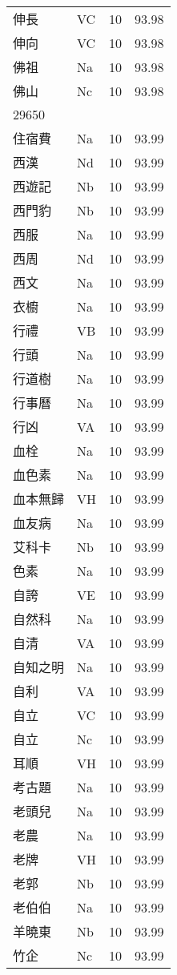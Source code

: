 \documentclass[twocolumn]{book}
\begin{document}
\begin{supertabular}{llrr}
伸長 & VC & 10 &  93.98\\
伸向 & VC & 10 &  93.98\\
佛祖 & Na & 10 &  93.98\\
佛山 & Nc & 10 &  93.98\\
29650\\
住宿費 & Na & 10 &  93.99\\
西漢 & Nd & 10 &  93.99\\
西遊記 & Nb & 10 &  93.99\\
西門豹 & Nb & 10 &  93.99\\
西服 & Na & 10 &  93.99\\
西周 & Nd & 10 &  93.99\\
西文 & Na & 10 &  93.99\\
衣櫥 & Na & 10 &  93.99\\
行禮 & VB & 10 &  93.99\\
行頭 & Na & 10 &  93.99\\
行道樹 & Na & 10 &  93.99\\
行事曆 & Na & 10 &  93.99\\
行凶 & VA & 10 &  93.99\\
血栓 & Na & 10 &  93.99\\
血色素 & Na & 10 &  93.99\\
血本無歸 & VH & 10 &  93.99\\
血友病 & Na & 10 &  93.99\\
艾科卡 & Nb & 10 &  93.99\\
色素 & Na & 10 &  93.99\\
自誇 & VE & 10 &  93.99\\
自然科 & Na & 10 &  93.99\\
自清 & VA & 10 &  93.99\\
自知之明 & Na & 10 &  93.99\\
自利 & VA & 10 &  93.99\\
自立 & VC & 10 &  93.99\\
自立 & Nc & 10 &  93.99\\
耳順 & VH & 10 &  93.99\\
考古題 & Na & 10 &  93.99\\
老頭兒 & Na & 10 &  93.99\\
老農 & Na & 10 &  93.99\\
老牌 & VH & 10 &  93.99\\
老郭 & Nb & 10 &  93.99\\
老伯伯 & Na & 10 &  93.99\\
羊曉東 & Nb & 10 &  93.99\\
竹企 & Nc & 10 &  93.99\\

\end{supertabular}
\end{document}
